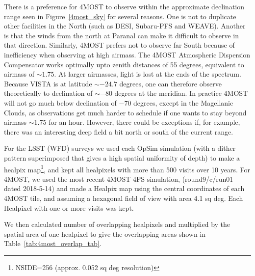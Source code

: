\documentclass[a4paper,10pt]{article}
\begin{document}
There is a preference for 4MOST to observe within the approximate
declination range seen in Figure~\ref{4most_sky} for several
reasons. One is not to duplicate other facilities in the North (such
as DESI, Subaru-PFS and WEAVE). Another is that the winds from the
north at Paranal can make it difficult to observe in that
direction. Similarly, 4MOST prefers not to observe far South because
of inefficiency when observing at high airmass. The 4MOST Atmospheric
Dispersion Compensator works optimally upto zenith distances of 55
degrees, equivalent to airmass of $\sim1.75$. At larger airmasses,
light is lost at the ends of the spectrum. Because VISTA is at
latitude $\sim -24.7$ degrees, one can therefore observe theoretically
to declination of $\sim -80$ degrees at the meridian. In practice
4MOST will not go much below declination of $-70$ degrees, except in
the Magellanic Clouds, as observations get much harder to schedule if
one wants to stay beyond airmass $\sim 1.75$ for an hour. However,
there could be exceptions if, for example, there was an interesting
deep field a bit north or south of the current range.

For the LSST (WFD) surveys we used each OpSim simulation (with a dither
pattern superimposed that gives a high spatial uniformity of depth) to
make a healpix map\footnote{NSIDE=256 (approx. 0.052 sq deg resolution)}, and kept all healpixels with more than 500 visits
over 10 years. For 4MOST, we used the most recent 4MOST 4FS simulation,
(round9/c/run01 dated 2018-5-14) and made a Healpix map using the
central coordinates of each 4MOST tile, and assuming a hexagonal field
of view with area 4.1 sq deg. Each Healpixel with one or more visits
was kept.
 

We then calculated number of overlapping healpixels and multiplied by the
spatial area of one healpixel to give the overlapping areas shown in
Table~\ref{tab:4most_overlap_tab}.
\end{document}
